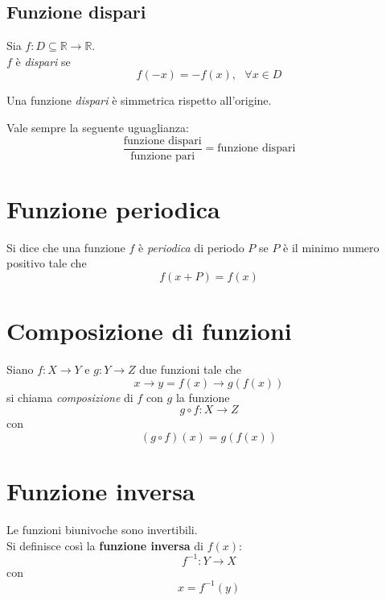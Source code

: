 \documentclass[a4paper,12pt, oneside]{book}
\begin{document}
\subsection{Funzione dispari}
\begin{definizione}
	Sia $f:D\subseteq \mathbb{R} \rightarrow \mathbb{R}$.\\
	$f$ è \emph{dispari} se
	\begin{equation}
		f(-x)=-f(x), \mbox{ } \forall x \in D
	\end{equation}
\end{definizione}
\begin{nota}
	Una funzione \emph{dispari} è simmetrica rispetto all'origine.
\end{nota}
\begin{shaded}
	\begin{nota}
		Vale sempre la seguente uguaglianza:
		$$\frac{\mbox{funzione dispari}}{\mbox{funzione pari}} = \mbox{funzione dispari}$$
	\end{nota}
\end{shaded}
\section{Funzione periodica}
\begin{definizione}
	Si dice che una funzione $f$ è \emph{periodica} di periodo $P$ se $P$ è il minimo numero positivo tale che
	\begin{equation}
		f(x+P) = f(x)
	\end{equation}
\end{definizione}
\section{Composizione di funzioni}
\begin{definizione}
	Siano $f: X \rightarrow Y$ e $g: Y \rightarrow Z$ due funzioni tale che
	\begin{equation}
		x \longrightarrow y = f(x) \longrightarrow g(f(x))
	\end{equation}
	si chiama \emph{composizione} di $f$ con $g$ la funzione
	\begin{equation}
		g \circ f: X\rightarrow Z
	\end{equation}
	con
	\begin{equation}
		(g\circ f)(x)=g(f(x))
	\end{equation}
\end{definizione}
\section{Funzione inversa}
\begin{definizione}
	Le funzioni biunivoche sono invertibili.\\
	Si definisce così la \textbf{funzione inversa} di $f(x)$:
	\begin{equation}
		f^{-1}:Y\rightarrow X
	\end{equation}
	con
	\begin{equation}
		x = f^{-1}(y)
	\end{equation}
\end{definizione}
\end{document}
